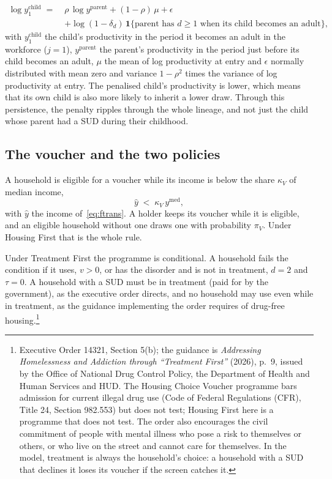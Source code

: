 \documentclass[10pt]{article}
\begin{document}
\begin{equation}\label{eq:fnewborn}
\begin{aligned}
\log y_{1}^{\text{child}}\;=\;&\rho\,\log y^{\text{parent}}+(1-\rho)\,\mu+\epsilon\\
&+\log(1-\delta_d)\,\mathbf{1}\{\text{parent has } d\ge1 \text{ when its child becomes an adult}\},
\end{aligned}
\end{equation}
with $y_1^{\text{child}}$ the child's productivity in the period it becomes an adult in the workforce ($j=1$), $y^{\text{parent}}$ the parent's productivity in the period just before its child becomes an adult, $\mu$
the mean of log productivity at entry and $\epsilon$ normally distributed with mean zero and
variance $1-\rho^2$ times the variance of log productivity at entry.   The penalised child's productivity is lower, which means that its own child is also more likely to inherit a lower draw. Through this persistence, the penalty ripples through the whole lineage, and not just the child whose parent had a SUD during their childhood.

\subsection{The voucher and the two policies}\label{sec:fvoucher}

A household is eligible for a voucher while its income is below the share
$\kappa_V$ of median income,
\begin{equation}\label{eq:felig}
\hat y\;<\;\kappa_V\,y^{\text{med}},
\end{equation}
with $\hat y$ the income of~\eqref{eq:ftrans}. A holder keeps its voucher while it is
eligible, and an eligible household without one draws one with probability
$\pi_V$. Under Housing First that is the whole rule.

Under Treatment First the programme is conditional. A household fails the condition if
it uses, $v>0$, or has the disorder and is not in treatment, $d=2$ and $\tau=0$. A household with a SUD must be in treatment (paid for by the government), as the executive order directs, and no household may use even while in treatment, as the guidance implementing the order requires of drug-free housing.\footnote{ Executive Order 14321, Section 5(b); the guidance is \emph{Addressing Homelessness and Addiction through ``Treatment First''} (2026), p.~9, issued by the Office of National Drug Control Policy, the Department of Health and Human Services and HUD. The Housing Choice Voucher programme bars admission for current illegal drug use (Code of Federal Regulations (CFR), Title 24, Section 982.553) but does not test; Housing First here is a programme that does not test. The order also encourages the civil commitment of people with mental illness who pose a risk to themselves or others, or who live on the street and cannot care for themselves. In the model, treatment is always the household's choice: a household with a SUD that declines it loses its voucher if the screen catches it.}
\end{document}

